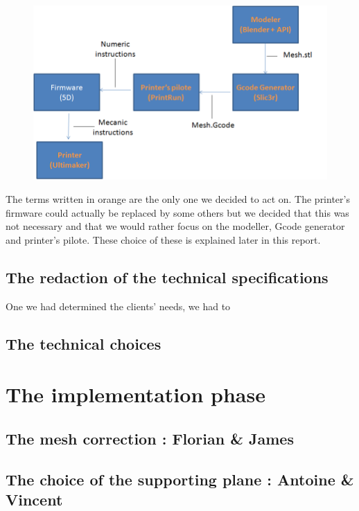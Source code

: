 \documentclass{report}
\begin{document}
\begin{figure}[!h]
\begin{center}
	\includegraphics[scale=0.2]{ARD1}
\end{center}
\end{figure}

The terms written in orange are the only one we decided to act on. The printer's firmware could actually be replaced by some others but we decided that this was not necessary and that we would rather focus on the modeller, Gcode generator and printer's pilote. These choice of these is explained later in this report. 

\section{The redaction of the technical specifications}

One we had determined the clients' needs, we had to

\section{The technical choices}

\chapter{The implementation phase}

\section{The mesh correction : Florian \& James}

\section{The choice of the supporting plane : Antoine \& Vincent}
\end{document}

